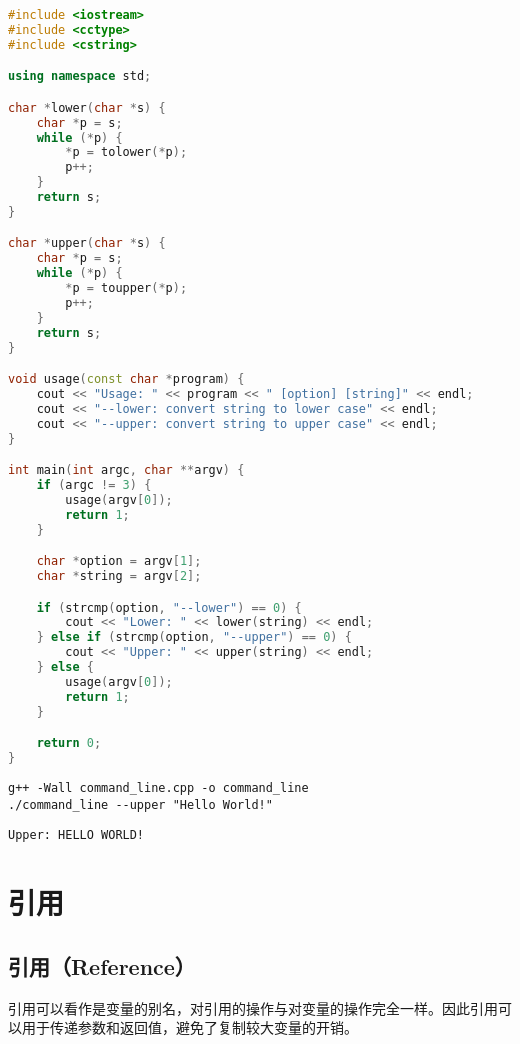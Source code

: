 \begin{lstlisting}[language=C++]
#include <iostream>
#include <cctype>
#include <cstring>

using namespace std;

char *lower(char *s) {
    char *p = s;
    while (*p) {
        *p = tolower(*p);
        p++;
    }
    return s;
}

char *upper(char *s) {
    char *p = s;
    while (*p) {
        *p = toupper(*p);
        p++;
    }
    return s;
}

void usage(const char *program) {
    cout << "Usage: " << program << " [option] [string]" << endl;
    cout << "--lower: convert string to lower case" << endl;
    cout << "--upper: convert string to upper case" << endl;
}

int main(int argc, char **argv) {
    if (argc != 3) {
        usage(argv[0]);
        return 1;
    }

    char *option = argv[1];
    char *string = argv[2];

    if (strcmp(option, "--lower") == 0) {
        cout << "Lower: " << lower(string) << endl;
    } else if (strcmp(option, "--upper") == 0) {
        cout << "Upper: " << upper(string) << endl;
    } else {
        usage(argv[0]);
        return 1;
    }

    return 0;
}
\end{lstlisting}

\begin{lstlisting}
g++ -Wall command_line.cpp -o command_line
./command_line --upper "Hello World!"
\end{lstlisting}

\begin{tcolorbox}
    \begin{verbatim}
Upper: HELLO WORLD!
	\end{verbatim}
\end{tcolorbox}

\newpage

\section{引用}

\subsection{引用（Reference）}

引用可以看作是变量的别名，对引用的操作与对变量的操作完全一样。因此引用可以用于传递参数和返回值，避免了复制较大变量的开销。\\

